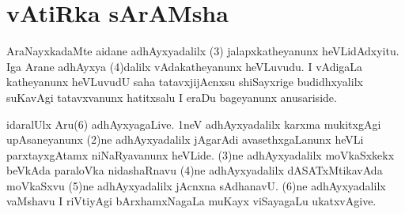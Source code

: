 \chapter{vAtiRka sArAMsha}



\begin{artha}
AraNayxkadaMte aidane adhAyxyadalilx (3) jalapxkatheyanunx heVLidAdxyitu. Iga Arane adhAyxya (4)dalilx vAdakatheyanunx heVLuvudu. I vAdigaLa katheyanunx heVLuvudU saha tatavxjijAcnxsu shiSayxrige budidhxyalilx suKavAgi tatavxvanunx hatitxsalu I eraDu bageyanunx anusariside.
\end{artha}


\begin{artha}
idaralUlx Aru(6) adhAyxyagaLive. 1neV adhAyxyadalilx karxma mukitxgAgi upAsaneyanunx (2)ne adhAyxyadalilx jAgarAdi avasethxgaLanunx heVLi parxtayxgAtamx niNaRyavanunx heVLide. (3)ne adhAyxyadalilx moVkaSxkekx beVkAda paraloVka nidashaRnavu (4)ne adhAyxyadalilx dASATxMtikavAda moVkaSxvu (5)ne adhAyxyadalilx jAcnxna sAdhanavU. (6)ne adhAyxyadalilx vaMshavu I riVtiyAgi bArxhamxNagaLa muKayx viSayagaLu ukatxvAgive.
\end{artha}


